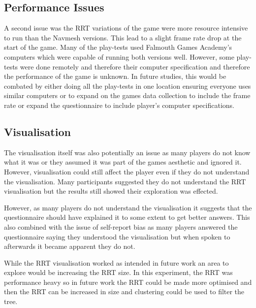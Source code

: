 \documentclass[journal]{IEEEtran}
\begin{document}
	\subsection{Performance Issues}
	A second issue was the RRT variations of the game were more resource intensive to run than the Navmesh versions. This lead to a slight frame rate drop at the start of the game. 
	Many of the play-tests used Falmouth Games Academy's computers which were capable of running both versions well. However, some play-tests were done remotely and therefore their computer specification and therefore the performance of the game is unknown. In future studies, this would be combated by either doing all the play-tests in one location ensuring everyone uses similar computers or to expand on the games data collection to include the frame rate or expand the questionnaire to include player's computer specifications.     
	
	\subsection{Visualisation}    
	The visualisation itself was also potentially an issue as many players do not know what it was or they assumed it was part of the games aesthetic and ignored it. However, visualisation could still affect the player even if they do not understand the visualisation.  Many participants suggested they do not understand the RRT visualisation but the results still showed their exploration was effected. 
	
	However, as many players do not understand the visualisation it suggests that the questionnaire should have explained it to some extent to get better answers. This also combined with the issue of self-report bias as many players answered the questionnaire saying they understood the visualisation but when spoken to afterwards it became apparent they do not. 
	
	While the RRT visualisation worked as intended in future work an area to explore would be increasing the RRT size.  In this experiment, the RRT was performance heavy so in future work the RRT could be made more optimised and then the RRT can be increased in size and clustering could be used to filter the tree.
	
\end{document}
